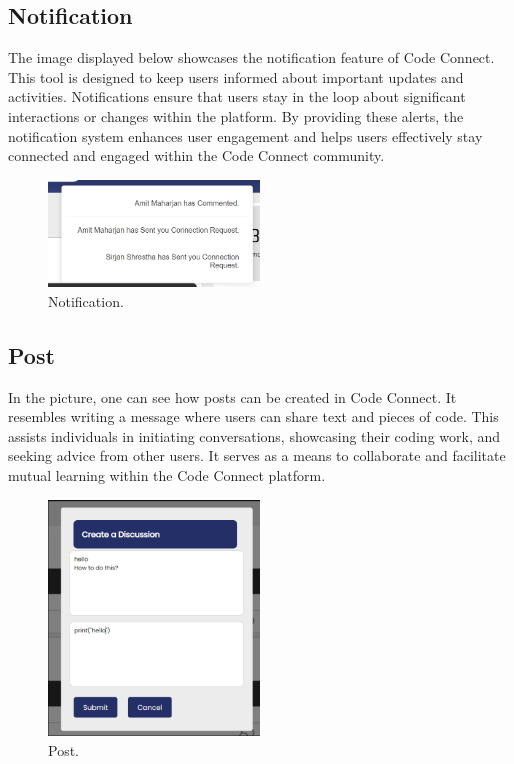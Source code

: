 \subsection{Notification}
The image displayed below showcases the notification feature of Code Connect. This tool is designed to keep users informed about important updates and activities. Notifications ensure that users stay in the loop about significant interactions or changes within the platform. By providing these alerts, the notification system enhances user engagement and helps users effectively stay connected and engaged within the Code Connect community.
\begin{figure}[H]
    \centering
    \includegraphics[width=0.5\textwidth]{Outcome-ss/notification.png}
    \caption{Notification.}
    \label{fig:Notification}
\end{figure}

\subsection{Post}
In the picture, one can see how posts can be created in Code Connect. It resembles writing a message where users can share text and pieces of code. This assists individuals in initiating conversations, showcasing their coding work, and seeking advice from other users. It serves as a means to collaborate and facilitate mutual learning within the Code Connect platform.
\begin{figure}[H]
    \centering
    \includegraphics[width=0.5\textwidth]{Outcome-ss/post.png}
    \caption{Post.}
    \label{fig:Post}
\end{figure}
\newpage
